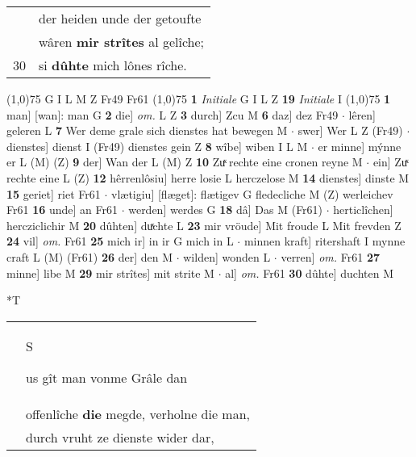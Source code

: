 \documentclass[8pt,a4paper,notitlepage]{article}
\begin{document}
\begin{table}[ht]
\begin{minipage}[t]{0.5\linewidth}
\begin{tabular}{rl}
 & der heiden unde der getoufte\\ 
 & wâren \textbf{mir strîtes} al gelîche;\\ 
30 & si \textbf{dûhte} mich lônes rîche.\\ 
\end{tabular}
\scriptsize
\line(1,0){75} \newline
G I L M Z Fr49 Fr61 \newline
\line(1,0){75} \newline
\textbf{1} \textit{Initiale} G I L Z  \textbf{19} \textit{Initiale} I  \newline
\line(1,0){75} \newline
\textbf{1} man] [wan]: man G \textbf{2} die] \textit{om.} L Z \textbf{3} durch] Zcu M \textbf{6} daz] dez Fr49  $\cdot$ lêren] geleren L \textbf{7} Wer deme grale sich dienstes hat bewegen M  $\cdot$ swer] Wer L Z (Fr49)  $\cdot$ dienstes] dienst I (Fr49) dienstes gein Z \textbf{8} wîbe] wiben I L M  $\cdot$ er minne] mýnne er L (M) (Z) \textbf{9} der] Wan der L (M) Z \textbf{10} Zuͯ rechte eine cronen reyne M  $\cdot$ ein] Zuͯ rechte eine L (Z) \textbf{12} hêrrenlôsiu] herre losie L herczelose M \textbf{14} dienstes] dinste M \textbf{15} geriet] riet Fr61  $\cdot$ vlætigiu] [flæget]: flætigev G fledecliche M (Z) werleichev Fr61 \textbf{16} unde] an Fr61  $\cdot$ werden] werdes G \textbf{18} dâ] Das M (Fr61)  $\cdot$ herticlîchen] hercziclichir M \textbf{20} dûhten] duͯchte L \textbf{23} mir vröude] Mit froude L Mit frevden Z \textbf{24} vil] \textit{om.} Fr61 \textbf{25} mich ir] in ir G mich in L  $\cdot$ minnen kraft] ritershaft I mynne craft L (M) (Fr61) \textbf{26} der] den M  $\cdot$ wilden] wonden L  $\cdot$ verren] \textit{om.} Fr61 \textbf{27} minne] libe M \textbf{29} mir strîtes] mit strite M  $\cdot$ al] \textit{om.} Fr61 \textbf{30} dûhte] duchten M \newline
\end{minipage}
\hspace{0.5cm}
\begin{minipage}[t]{0.5\linewidth}
\small
\begin{center}*T
\end{center}
\begin{tabular}{rl}
 & \begin{large}S\end{large}us gît man vonme Grâle dan\\ 
 & offenlîche \textbf{die} megde, verholne die man,\\ 
 & durch vruht ze dienste wider dar,\\ 

\end{tabular}
\end{minipage}
\end{table}
\end{document}
